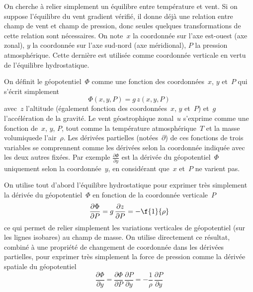 \sk
On cherche à relier simplement un équilibre entre température et vent. Si on suppose l'équilibre du vent gradient vérifié, il donne déjà une relation entre champ de vent et champ de pression, donc seules quelques transformations de cette relation sont nécessaires. On note~$x$ la coordonnée sur l'axe est-ouest (axe zonal), $y$ la coordonnée sur l'axe sud-nord (axe méridional), $P$ la pression atmosphérique. Cette dernière est utilisée comme coordonnée verticale en vertu de l'équilibre hydrostatique.

\sk
On définit le géopotentiel~$\Phi$ comme une fonction des coordonnées~$x$, $y$ et~$P$ qui s'écrit simplement
\[ \Phi(x,y,P)=g \, z(x,y,P) \] 
\noindent avec~$z$ l'altitude (également fonction des coordonnées~$x$, $y$ et~$P$) et~$g$ l'accélération de la gravité. Le vent géostrophique zonal~$u$ s'exprime comme une fonction de~$x$, $y$, $P$, tout comme la température atmosphérique~$T$ et la masse volumiquede l'air~$\rho$. Les dérivées partielles (notées~$\partial$) de ces fonctions de trois variables se comprennent comme les dérivées selon la coordonnée indiquée avec les deux autres fixées. Par exemple $\frac{\partial \Phi}{\partial y}$ est la dérivée du géopotentiel~$\Phi$ uniquement selon la coordonnée~$y$, en considérant que~$x$ et~$P$ ne varient pas. 

\sk
On utilise tout d'abord l'équilibre hydrostatique pour exprimer très simplement la dérivée du géopotentiel~$\Phi$ en fonction de la coordonnée verticale~$P$
\[ \frac{\partial \Phi}{\partial P} = g \, \frac{\partial z}{\partial P} = -\f{1}{\rho} \] 
\noindent ce qui permet de relier simplement les variations verticales de géopotentiel (sur les lignes isobares) au champ de masse.
On utilise directement ce résultat, combiné à une propriété de changement de coordonnée dans les dérivées partielles, pour exprimer très simplement la force de pression comme la dérivée spatiale du géopotentiel
\[ \frac{\partial \Phi}{\partial y} = \frac{\partial \Phi}{\partial P} \, \frac{\partial P}{\partial y} = -\frac{1}{\rho} \, \frac{\partial P}{\partial y} \]

